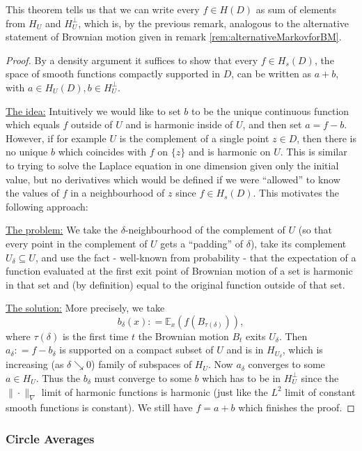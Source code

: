 \documentclass[11pt,reqno]{amsart}
\numberwithin{equation}{section}
\newcommand{\deq}{\mathrel{\mathop:}=}
\begin{document}
This theorem tells us that we can write every $f\in H(D)$ as sum of elements from $H_U$ and $H_U^\perp$, which is, by the previous remark, analogous to the alternative statement of Brownian motion given in remark \ref{rem:alternativeMarkovforBM}.

\begin{proof}
	By a density argument it suffices to show that every $f\in H_s(D)$, the space of smooth functions compactly supported in $D$, can be written as $a+b$, with $a\in H_U(D), b\in H_U^\perp$.
	
	\underline{The idea:} Intuitively we would like to set $b$ to be the unique continuous function which equals $f$ outside of $U$ and is harmonic inside of $U$, and then set $a=f-b$. However, if for example $U$ is the complement of a single point $z\in D$, then there is no unique $b$ which coincides with $f$ on $\{z\}$ and is harmonic on $U$. This is similar to trying to solve the Laplace equation in one dimension given only the initial value, but no derivatives which would be defined if we were ``allowed'' to know the values of $f$ in a neighbourhood of $z$ since $f\in H_s(D)$. This motivates the following approach:
	
	\underline{The problem:} We take the $\delta$-neighbourhood of the complement of $U$ (so that every point in the complement of $U$ gets a ``padding'' of $\delta$), take its complement $U_\delta\subseteq U$, and use the fact - well-known from probability - that the expectation of a function evaluated at the first exit point of Brownian motion of a set is harmonic in that set and (by definition) equal to the original function outside of that set.
	
	\underline{The solution:} More precisely, we take $$b_\delta(x)\deq \mathbb E_x(f(B_{\tau(\delta)})),$$ where $\tau(\delta)$ is the first time $t$ the Brownian motion $B_t$ exits $U_\delta$. Then $a_\delta\deq f-b_\delta$ is supported on a compact subset of $U$ and is in $H_{U_\delta}$, which is increasing (as $\delta\searrow 0$) family of subspaces of $H_U$. Now $a_\delta$ converges to some $a\in H_U$. Thus the $b_\delta$ must converge to some $b$ which has to be in $H_U^\perp$ since the $\|\cdot\|_\nabla$ limit of harmonic functions is harmonic (just like the $L^2$ limit of constant smooth functions is constant). 
	We still have $f=a+b$ which finishes the proof.
\end{proof}

\subsubsection{Circle Averages}
\end{document}

